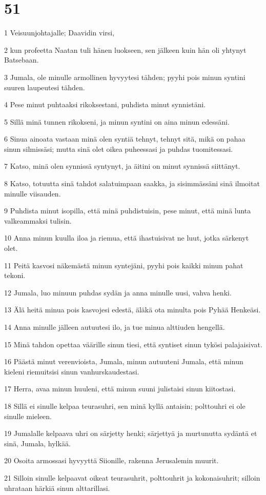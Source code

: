 \chapter{51}

\par 1 Veisuunjohtajalle; Daavidin virsi,
\par 2 kun profeetta Naatan tuli hänen luokseen, sen jälkeen kuin hän oli yhtynyt Batsebaan.
\par 3 Jumala, ole minulle armollinen hyvyytesi tähden; pyyhi pois minun syntini suuren laupeutesi tähden.
\par 4 Pese minut puhtaaksi rikoksestani, puhdista minut synnistäni.
\par 5 Sillä minä tunnen rikokseni, ja minun syntini on aina minun edessäni.
\par 6 Sinua ainoata vastaan minä olen syntiä tehnyt, tehnyt sitä, mikä on pahaa sinun silmissäsi; mutta sinä olet oikea puheessasi ja puhdas tuomitessasi.
\par 7 Katso, minä olen synnissä syntynyt, ja äitini on minut synnissä siittänyt.
\par 8 Katso, totuutta sinä tahdot salatuimpaan saakka, ja sisimmässäni sinä ilmoitat minulle viisauden.
\par 9 Puhdista minut isopilla, että minä puhdistuisin, pese minut, että minä lunta valkeammaksi tulisin.
\par 10 Anna minun kuulla iloa ja riemua, että ihastuisivat ne luut, jotka särkenyt olet.
\par 11 Peitä kasvosi näkemästä minun syntejäni, pyyhi pois kaikki minun pahat tekoni.
\par 12 Jumala, luo minuun puhdas sydän ja anna minulle uusi, vahva henki.
\par 13 Älä heitä minua pois kasvojesi edestä, äläkä ota minulta pois Pyhää Henkeäsi.
\par 14 Anna minulle jälleen autuutesi ilo, ja tue minua alttiuden hengellä.
\par 15 Minä tahdon opettaa väärille sinun tiesi, että syntiset sinun tykösi palajaisivat.
\par 16 Päästä minut verenvioista, Jumala, minun autuuteni Jumala, että minun kieleni riemuitsisi sinun vanhurskaudestasi.
\par 17 Herra, avaa minun huuleni, että minun suuni julistaisi sinun kiitostasi.
\par 18 Sillä ei sinulle kelpaa teurasuhri, sen minä kyllä antaisin; polttouhri ei ole sinulle mieleen.
\par 19 Jumalalle kelpaava uhri on särjetty henki; särjettyä ja murtunutta sydäntä et sinä, Jumala, hylkää.
\par 20 Osoita armossasi hyvyyttä Siionille, rakenna Jerusalemin muurit.
\par 21 Silloin sinulle kelpaavat oikeat teurasuhrit, polttouhrit ja kokonaisuhrit; silloin uhrataan härkiä sinun alttarillasi.

